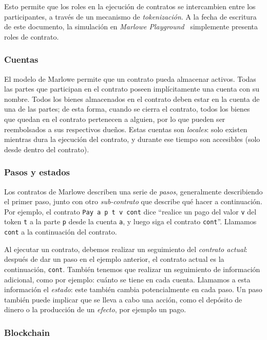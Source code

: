 \documentclass[12pt]{book}
\begin{document}
Esto permite que los roles en la ejecución de contratos se intercambien entre los participantes, a través de un mecanismo de \textit{tokenización}. A la fecha de escritura de este documento, la simulación en \textit{Marlowe Playground}~\cite{marlowe_playground} simplemente presenta roles de contrato.

\subsubsection{Cuentas}
El modelo de Marlowe permite que un contrato pueda almacenar activos. Todas las partes que participan en el contrato poseen implícitamente una cuenta con su nombre. Todos los bienes almacenados en el contrato deben estar en la cuenta de una de las partes; de esta forma, cuando se cierra el contrato, todos los bienes que quedan en el contrato pertenecen a alguien, por lo que pueden ser reembolsados a sus respectivos dueños. Estas cuentas son \textit{locales}: solo existen mientras dura la ejecución del contrato, y durante ese tiempo son accesibles (solo desde dentro del contrato).

\subsubsection{Pasos y estados}
Los contratos de Marlowe describen una serie de \textit{pasos}, generalmente describiendo el primer paso, junto con otro \textit{sub-contrato} que describe qué hacer a continuación. Por ejemplo, el contrato \texttt{Pay a p t v cont} dice ``realice un pago del valor \texttt{v} del token \texttt{t} a la parte \texttt{p} desde la cuenta \texttt{a}, y luego siga el contrato \texttt{cont}''. Llamamos \texttt{cont} a la continuación del contrato.

Al ejecutar un contrato, debemos realizar un seguimiento del \textit{contrato actual}: después de dar un paso en el ejemplo anterior, el contrato actual es la continuación, \texttt{cont}. También tenemos que realizar un seguimiento de información adicional, como por ejemplo: cuánto se tiene en cada cuenta. Llamamos a esta información el \textit{estado}: este también cambia potencialmente en cada paso. Un paso también puede implicar que se lleva a cabo una acción, como el depósito de dinero o la producción de un \textit{efecto}, por ejemplo un pago.

\subsubsection{Blockchain}
\end{document}
